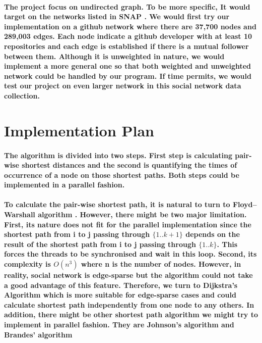 \documentclass{article}
\begin{document}
\paragraph{
The project focus on undirected graph. To be more specific, It would target on the networks listed in SNAP \cite{snapnets}. We would first try our implementation on a github network \cite{rozemberczki2019multiscale} where there are 37,700 nodes and 289,003 edges. Each node indicate a github developer with at least 10 repositories and each edge is established if there is a mutual follower between them. Although it is unweighted in nature, we would implement a more general one so that both weighted and unweighted network could be handled by our program. If time permits, we would test our project on even larger network in this social network data collection.
}
\section{Implementation Plan}
\paragraph{
The algorithm is divided into two steps. First step is calculating pair-wise shortest distances and the second is quantifying the times of occurrence of a node on those shortest paths. Both steps could be implemented in a parallel fashion. 
}
\paragraph{
To calculate the pair-wise shortest path, it is natural to turn to  Floyd–Warshall algorithm \cite{floyd1962algorithm}. However, there might be two major limitation. First, its nature does not fit for the parallel implementation since the shortest path from i to j passing through $\{1..k+1\}$ depends on the result of the shortest path from i to j passing through $\{1..k\}$. This forces the threads to be synchronised and wait in this loop. Second, its complexity is $O(n^3)$ where n is the number of nodes. However, in reality, social network is edge-sparse but the algorithm could not take a good advantage of this feature. Therefore, we turn to Dijkstra's Algorithm \cite{dijkstra1959note} which is more suitable for edge-sparse cases and could calculate shortest path independently from one node to any others. In addition, there might be other shortest path algorithm we might try to implement in parallel fashion. They are Johnson's algorithm \cite{johnson1977efficient} and Brandes' algorithm \cite{brandes2001faster}
}
\end{document}

